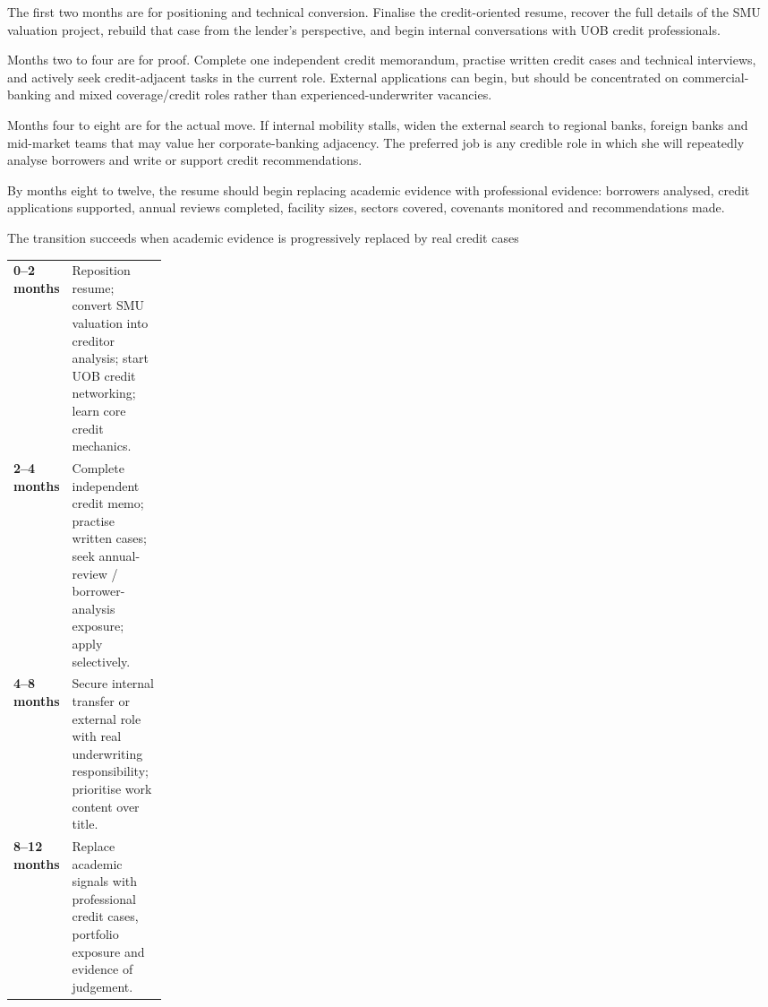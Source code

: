 \documentclass[theme=editorial,publication-type=feature-article]{reportkit}
\begin{document}
\begin{featurecolumns}
The first two months are for positioning and technical conversion. Finalise the credit-oriented resume, recover the full details of the SMU valuation project, rebuild that case from the lender's perspective, and begin internal conversations with UOB credit professionals.

Months two to four are for proof. Complete one independent credit memorandum, practise written credit cases and technical interviews, and actively seek credit-adjacent tasks in the current role. External applications can begin, but should be concentrated on commercial-banking and mixed coverage/credit roles rather than experienced-underwriter vacancies.

Months four to eight are for the actual move. If internal mobility stalls, widen the external search to regional banks, foreign banks and mid-market teams that may value her corporate-banking adjacency. The preferred job is any credible role in which she will repeatedly analyse borrowers and write or support credit recommendations.

By months eight to twelve, the resume should begin replacing academic evidence with professional evidence: borrowers analysed, credit applications supported, annual reviews completed, facility sizes, sectors covered, covenants monitored and recommendations made.
\end{featurecolumns}

\begin{featureexhibit}{The transition succeeds when academic evidence is progressively replaced by real credit cases}
\begin{featuretable}
\begin{tabularx}{\linewidth}{>{\bfseries}p{0.20\linewidth} X}
0--2 months & Reposition resume; convert SMU valuation into creditor analysis; start UOB credit networking; learn core credit mechanics. \\
2--4 months & Complete independent credit memo; practise written cases; seek annual-review / borrower-analysis exposure; apply selectively. \\
4--8 months & Secure internal transfer or external role with real underwriting responsibility; prioritise work content over title. \\
8--12 months & Replace academic signals with professional credit cases, portfolio exposure and evidence of judgement. \\
\end{tabularx}
\end{featuretable}
\end{featureexhibit}
\end{document}
